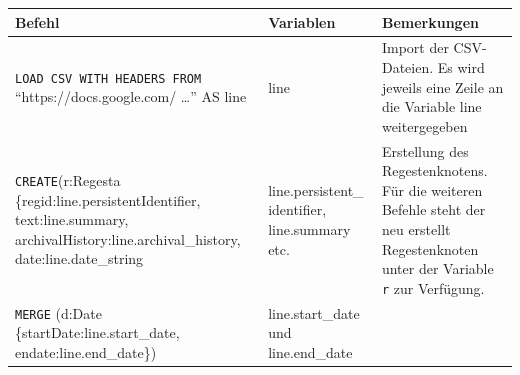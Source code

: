 \documentclass[ngerman,]{scrreprt}
\begin{document}
\begin{longtable}[]{@{}lll@{}}
\toprule
\begin{minipage}[b]{0.31\columnwidth}\raggedright\strut
Befehl\strut
\end{minipage} & \begin{minipage}[b]{0.23\columnwidth}\raggedright\strut
Variablen\strut
\end{minipage} & \begin{minipage}[b]{0.37\columnwidth}\raggedright\strut
Bemerkungen\strut
\end{minipage}\tabularnewline
\midrule
\endhead
\begin{minipage}[t]{0.31\columnwidth}\raggedright\strut
\texttt{LOAD\ CSV\ WITH\ HEADERS\ FROM} ``https://docs.google.com/ \ldots{}'' AS line\strut
\end{minipage} & \begin{minipage}[t]{0.23\columnwidth}\raggedright\strut
line\strut
\end{minipage} & \begin{minipage}[t]{0.37\columnwidth}\raggedright\strut
Import der CSV-Dateien. Es wird jeweils eine Zeile an die Variable line weitergegeben\strut
\end{minipage}\tabularnewline
\begin{minipage}[t]{0.31\columnwidth}\raggedright\strut
\texttt{CREATE}(r:Regesta \{regid:line.persistentIdentifier, text:line.summary, archivalHistory:line.archival\_history, date:line.date\_string\strut
\end{minipage} & \begin{minipage}[t]{0.23\columnwidth}\raggedright\strut
line.persistent\_ identifier, line.summary etc.\strut
\end{minipage} & \begin{minipage}[t]{0.37\columnwidth}\raggedright\strut
Erstellung des Regestenknotens. Für die weiteren Befehle steht der neu erstellt Regestenknoten unter der Variable \texttt{r} zur Verfügung.\strut
\end{minipage}\tabularnewline
\begin{minipage}[t]{0.31\columnwidth}\raggedright\strut
\texttt{MERGE} (d:Date \{startDate:line.start\_date, endate:line.end\_date\})\strut
\end{minipage} & \begin{minipage}[t]{0.23\columnwidth}\raggedright\strut
line.start\_date und line.end\_date\strut
\end{minipage} & \begin{minipage}[t]{0.37\columnwidth}\raggedright\strut

\end{minipage}
\end{longtable}
\end{document}
